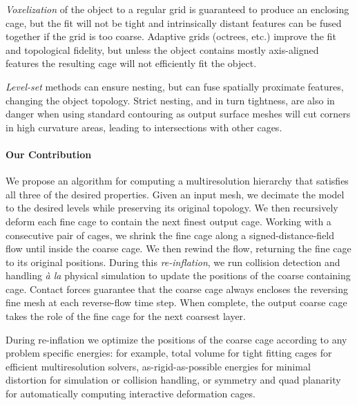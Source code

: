 \emph{Voxelization} of the object to a regular grid is guaranteed to produce
an enclosing cage, but the fit will not be tight and intrinsically distant
features can be fused together if the grid is too coarse. Adaptive grids
(octrees, etc.) improve the fit and topological fidelity, but unless the object
contains mostly axis-aligned features the resulting cage will not efficiently
fit the object.

\emph{Level-set} methods can ensure nesting, but can fuse spatially proximate
features, changing the object topology. Strict nesting, and in turn tightness,
are also in danger when using standard contouring as output surface meshes will
cut corners in high curvature areas, leading to intersections with other
cages.


\paragraph{Our Contribution}
%
We propose an algorithm for computing a
multiresolution hierarchy that satisfies all three of the desired properties.
%
Given an input mesh, we decimate the model to the desired levels while
preserving its original topology.
%
We then recursively deform each fine cage to contain the next finest output
cage.
%
Working with a consecutive pair of cages,
we shrink the fine cage along a signed-distance-field flow until inside the
coarse cage.
%
We then rewind the flow, returning the fine cage to its original positions.
During this \emph{re-inflation}, we run collision detection and handling
\emph{à la} physical simulation to update the positions of the coarse
containing cage. Contact forces guarantee that the coarse cage always encloses
the reversing fine mesh at each reverse-flow time step.
%
When complete, the output coarse cage takes the role of the fine cage for the
next coarsest layer.

During re-inflation we optimize the positions of the coarse cage according to
any problem specific energies: for example, total volume for tight fitting
cages for efficient multiresolution solvers, as-rigid-as-possible energies for
minimal distortion for simulation or collision handling, or symmetry and quad
planarity for automatically computing interactive deformation cages.




